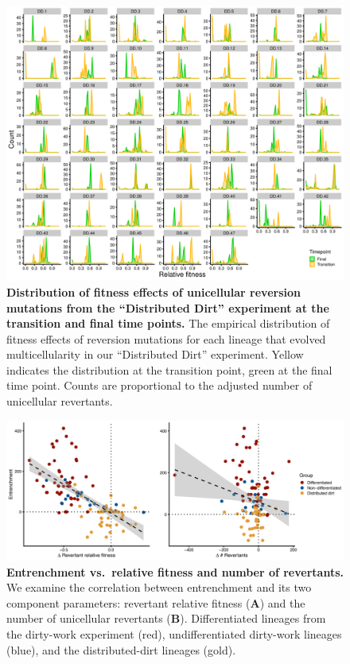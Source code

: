 \documentclass[
]{book}
\begin{document}
\begin{figure}
\centering
\includegraphics{images/Figure_S13_Dist_Dirt_Relative_fitness_distributions_20DEC22.png}
\caption{\label{fig:dd-DFERMs}\textbf{Distribution of fitness effects of unicellular reversion mutations from the ``Distributed Dirt'' experiment at the transition and final time points.} The empirical distribution of fitness effects of reversion mutations for each lineage that evolved multicellularity in our ``Distributed Dirt'' experiment. Yellow indicates the distribution at the transition point, green at the final time point. Counts are proportional to the adjusted number of unicellular revertants.}
\end{figure}

\begin{figure}
\centering
\includegraphics{images/Figure_S8_Entrenchment_vs_num_revertants_and_relative_fitness_12OCT22.png}
\caption{\label{fig:Entrenchment-vs-num-revertants-rel-fitness}\textbf{Entrenchment vs.~relative fitness and number of revertants.} We examine the correlation between entrenchment and its two component parameters: revertant relative fitness (\textbf{A}) and the number of unicellular revertants (\textbf{B}). Differentiated lineages from the dirty-work experiment (red), undifferentiated dirty-work lineages (blue), and the distributed-dirt lineages (gold).}
\end{figure}
\end{document}
